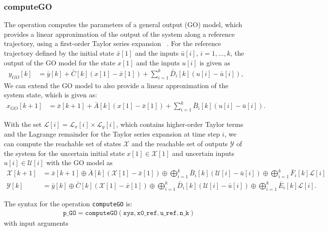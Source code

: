 \subsubsection{computeGO} \label{sec:computeGO}

The operation  computes the parameters of a general output (GO) model, which provides a linear approximation of the output of the system along a reference trajectory, using a first-order Taylor series expansion ~\cite{Luetzow2024b}. 
For the reference trajectory defined by the initial state $\bar{x}[1]$ and the inputs $\bar{u}[i]$, $i=1,...,k$, the output of the GO model for the state ${x}[1]$ and the inputs ${u}[i]$ is given as
\begin{align}
	y_{GO}[k] &= \bar{y}[k] + \bar{C}[k] (x[1]-\bar{x}[1]) + \sum_{i=1}^k \bar{D}_i[k] (u[i]-\bar{u}[i]) %
	, \label{eq:GOmodel_y}
\end{align} 
We can extend the GO model to also provide a linear approximation of the system state, which is given as:
\begin{align}	
	x_{GO}[k+1] &= \bar{x}[k+1] + \bar{A}[k] (x[1]-\bar{x}[1]) + \sum_{i=1}^k \bar{B}_i[k] (u[i]-\bar{u}[i]). %
	\label{eq:GOmodel_x} 
\end{align}

With the set $\mathcal{L}[i]=\mathcal{L}_x[i] \times \mathcal{L}_y[i]$, which contains higher-order Taylor terms and the Lagrange remainder for the Taylor series expansion at time step $i$, we can compute the reachable set of states $\mathcal{X}$ and the reachable set of outputs $\mathcal{Y}$ of the system for the uncertain initial state $x[1] \in \mathcal{X}[1]$ and uncertain inputs $u[i] \in \mathcal{U}[i]$ with the GO model as
\begin{align}
	\mathcal{X}[k+1] &= \bar{x}[k+1] \oplus \bar{A}[k] (\mathcal{X}[1]-\bar{x}[1]) \oplus \bigoplus_{i=1}^k \bar{B}_i[k] (\mathcal{U}[i]-\bar{u}[i]) \oplus \bigoplus_{i=1}^k \bar{F}_i[k] \mathcal{L}[i] \label{eq:GOmodel_xL} \\
	\mathcal{Y}[k] &= \bar{y}[k] \oplus \bar{C}[k] (\mathcal{X}[1]-\bar{x}[1]) \oplus \bigoplus_{i=1}^k \bar{D}_i[k] (\mathcal{U}[i]-\bar{u}[i]) \oplus \bigoplus_{i=1}^k \bar{E}_i[k] \mathcal{L}[i]. \label{eq:GOmodel_yL}
\end{align} 

The syntax for the operation \texttt{computeGO} is:
\begin{equation*}
\begin{split}
    & \texttt{p\_GO} = \texttt{computeGO}(\texttt{sys},\texttt{x0\_ref},\texttt{u\_ref},\texttt{n\_k})
\end{split}
\end{equation*}
with input arguments

